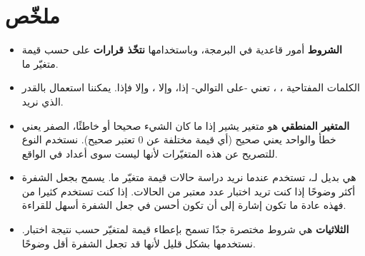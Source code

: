 \section*{ملخّص}

\begin{itemize}
	\item \textbf{الشروط}
	أمور قاعدية في البرمجة، وباستخدامها 
	\textbf{نتخّذ قرارات}
	 على حسب قيمة متغيّر ما.
	\item الكلمات المفتاحية
	 ،
	 ،
	 تعني -على التوالي- إذا، وإلا ، وإلا فإذا. يمكننا استعمال
	 بالقدر الذي نريد.
	 \item \textbf{المتغير المنطقي}
	 هو متغير يشير إذا ما كان الشيء صحيحا أو خاطئًا، الصفر يعني خطأ والواحد يعني صحيح (أي قيمة مختلفة عن 0 تعتبر صحيح). نستخدم النوع
	 للتصريح عن هذه المتغيّرات لأنها ليست سوى أعداد في الواقع.
	 \item {}
	 هي بديل لـ،
	  تستخدم عندما نريد دراسة حالات قيمة متغيّر ما. يسمح بجعل الشفرة أكثر وضوحًا إذا كنت تريد اختبار عدد معتبر من الحالات. إذا كنت تستخدم كثيرا من
	 فهذه عادة ما تكون إشارة إلى أن 
	 تكون أحسن في جعل الشفرة أسهل للقراءة.
	 \item \textbf{الثلاثيات} 
	 هي شروط مختصرة جدّا تسمح بإعطاء قيمة لمتغيّر حسب نتيجة اختبار. نستخدمها بشكل قليل لأنها قد تجعل الشفرة أقل وضوحًا.
\end{itemize}
